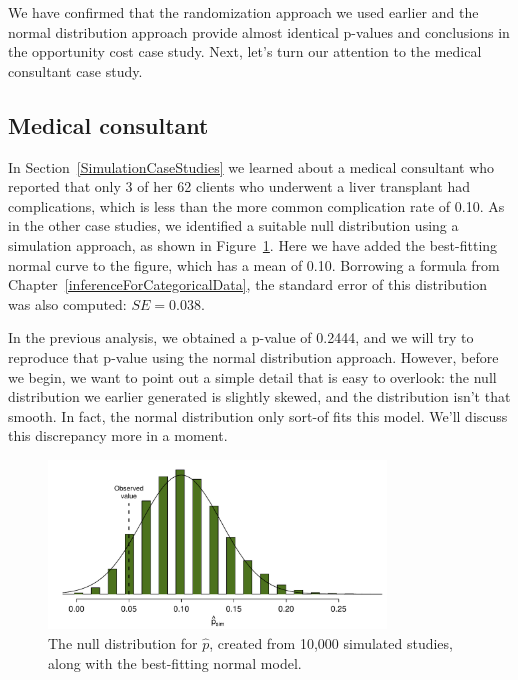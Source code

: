 We have confirmed that the randomization approach we used earlier and the normal distribution approach provide almost identical p-values and conclusions in the opportunity cost case study. Next, let's turn our attention to the medical consultant case study.


\subsection{Medical consultant}

In Section~\ref{SimulationCaseStudies} we learned about a medical consultant who reported that only 3 of her 62 clients who underwent a liver transplant had complications, which is less than the more common complication rate of 0.10. As in the other case studies, we identified a suitable null distribution using a simulation approach, as shown in Figure~\ref{MedConsNullSim_w_normal}. Here we have added the best-fitting normal curve to the figure, which has a mean of 0.10. Borrowing a formula from Chapter~\ref{inferenceForCategoricalData}, the standard error of this distribution was also computed: $SE = 0.038$.

In the previous analysis, we obtained a p-value of 0.2444, and we will try to reproduce that p-value using the normal distribution approach. However, before we begin, we want to point out a simple detail that is easy to overlook: the null distribution we earlier generated is slightly skewed, and the distribution isn't that smooth. In fact, the normal distribution only sort-of fits this model. We'll discuss this discrepancy more in a moment.

\begin{figure}
\centering
\includegraphics[width=0.8\textwidth]{02/figures/MedicalConsultant/MedConsNullSim_w_normal}
\caption{The null distribution for $\hat{p}$, created from 10,000 simulated studies, along with the best-fitting normal model.}
\label{MedConsNullSim_w_normal}
\end{figure}


